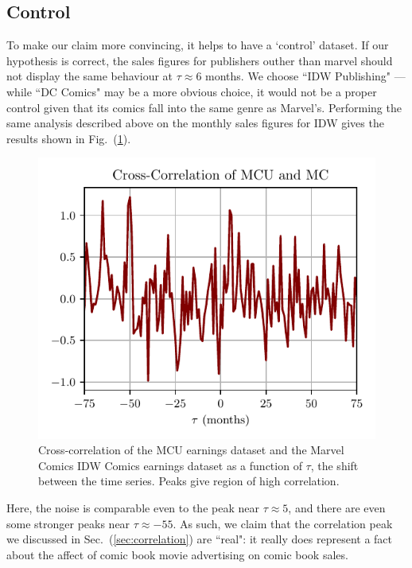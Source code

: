 \documentclass[12pt]{article}
\begin{document}
\subsection{Control}
To make our claim more convincing, it helps to have a `control' dataset.  If our hypothesis is correct, the sales figures for publishers outher than marvel should not display the same behaviour at $\tau \approx 6$ months.  We choose ``IDW Publishing" --- while ``DC Comics"  may be a more obvious choice, it would not be a proper control given that its comics fall into the same genre as Marvel's.  Performing the same analysis described above on the monthly sales figures for IDW gives the results shown in Fig.~(\ref{fig:correlation2}).
\begin{figure}[h]
    \centering
    \includegraphics{figures/correlation2.pdf}
    \caption{Cross-correlation of the MCU earnings dataset and the Marvel Comics IDW Comics earnings dataset as a function of $\tau$, the shift between the time series.  Peaks give region of high correlation.}\label{fig:correlation2}
\end{figure}
Here, the noise is comparable even to the peak near $\tau \approx 5$, and there are even some stronger peaks near $\tau \approx -55$.  As such, we claim that the correlation peak we discussed in Sec.~(\ref{sec:correlation}) are ``real": it really does represent a fact about the affect of comic book movie advertising on comic book sales.
\end{document}
